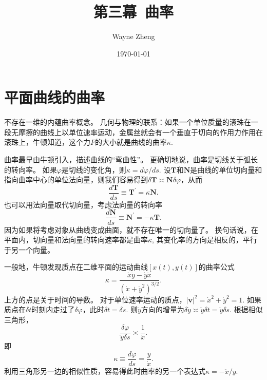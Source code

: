 \documentclass{article}
\title{第三幕~曲率}
\author{Wayne Zheng}
\date{\today}
\begin{document}
\maketitle
\tableofcontents

\section{平面曲线的曲率}

不存在一维的内蕴曲率概念。
几何与物理的联系：如果一个单位质量的滚珠在一段无摩擦的曲线上以单位速率运动，金属丝就会有一个垂直于切向的作用力作用在滚珠上，牛顿知道，这个力$F$的大小就是曲线的曲率$\kappa$.

曲率最早由牛顿引入，描述曲线的“弯曲性”。
更确切地说，曲率是切线关于弧长的转向率。
如果$\varphi$是切线的变化角，则$\kappa=d\varphi/ds$.
设$\mathbf{T}$和$\mathbf{N}$是曲线的单位切向量和指向曲率中心的单位法向量，则我们容易得到$\delta\mathbf{T}\asymp\mathbf{N}\delta\varphi$，从而
\begin{equation}
    \frac{d\mathbf{T}}{ds}\equiv\mathbf{T}^{\prime}
    =\kappa\mathbf{N}.
\end{equation}
也可以用法向量取代切向量，考虑法向量的转向率
\begin{equation}
    \frac{d\mathbf{N}}{ds}\equiv\mathbf{N}^{\prime}
    =-\kappa\mathbf{T}.
\end{equation}
因为如果将考虑对象从曲线变成曲面，就不存在唯一的切向量了。
换句话说，在平面内，切向量和法向量的转向速率都是曲率$\kappa$, 其变化率的方向是相反的，平行于另一个向量。

一般地，牛顿发现质点在二维平面的运动曲线$[x(t), y(t)]$的曲率公式
\begin{equation}
    \kappa
    =\frac{\dot{x}\ddot{y}-\dot{y}\ddot{x}}{\left(\dot{x}+\dot{y}^{2}\right)^{3/2}}.
\end{equation}
上方的点是关于时间的导数。
对于单位速率运动的质点，$|\mathbf{v}|^{2}=\dot{x}^{2}+\dot{y}^{2}=1$.
如果质点在$\delta{t}$时刻内走过了$\delta\varphi$，此时$\delta{t}=\delta{s}$.
则$\dot{y}$方向的增量为$\delta\dot{y}\asymp \ddot{y}\delta{t}=\ddot{y}\delta{s}$.
根据相似三角形，
\begin{equation*}
    \frac{\delta\varphi}{\ddot{y}\delta{s}}\asymp\frac{1}{\dot{x}}.
\end{equation*}
即
\begin{equation}
    \kappa\equiv\frac{d\varphi}{ds}
    =\frac{\ddot{y}}{\dot{x}}.
\end{equation}
利用三角形另一边的相似性质，容易得此时曲率的另一个表达式$\kappa=-\ddot{x}/\dot{y}$.
\end{document}
